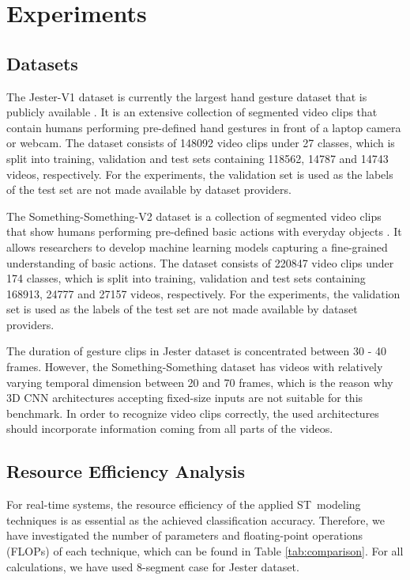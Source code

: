\documentclass[runningheads]{llncs}
\begin{document}
 \section{Experiments}


\subsection{Datasets}

The Jester-V1 dataset is currently the largest hand gesture dataset that is publicly available \cite{jester}. It is an extensive collection of segmented video clips that contain humans performing pre-defined hand gestures in front of a laptop camera or webcam. The dataset consists of 148092 video clips under 27 classes, which is split into training, validation and test sets containing 118562, 14787 and 14743 videos, respectively. For the experiments, the validation set is used as the labels of the test set are not made available by dataset providers.

The Something-Something-V2 dataset is a collection of segmented video clips that show humans performing pre-defined basic actions with everyday objects \cite{Goyal_undated-kx}. It allows researchers to develop machine learning models capturing a fine-grained understanding of basic actions. The dataset consists of 220847 video clips under 174 classes, which is split into training, validation and test sets containing 168913, 24777 and 27157 videos, respectively. For the experiments, the validation set is used as the labels of the test set are not made available by dataset providers.

The duration of gesture clips in Jester dataset is concentrated between 30 - 40 frames. However, the Something-Something dataset has videos with relatively varying temporal dimension between 20 and 70 frames, which is the reason why 3D CNN architectures accepting fixed-size inputs are not suitable for this benchmark. In order to recognize video clips correctly, the used architectures should incorporate information coming from all parts of the videos.


\subsection{Resource Efficiency Analysis}

For real-time systems, the resource efficiency of the applied ST~modeling techniques is as essential as the achieved classification accuracy. Therefore, we have investigated the number of parameters and floating-point operations (FLOPs) of each technique, which can be found in Table \ref{tab:comparison}. For all calculations, we have used 8-segment case for Jester dataset. 
\end{document}
